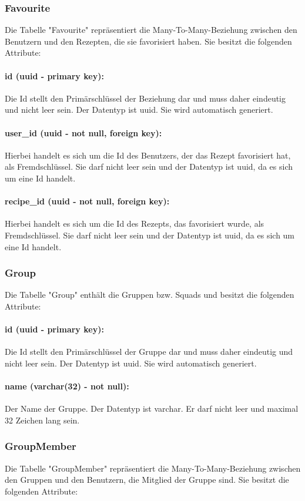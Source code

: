 \documentclass{entwurfsheft}
\begin{document}
\subsubsection{Favourite}
Die Tabelle "Favourite" repräsentiert die Many-To-Many-Beziehung zwischen den Benutzern und den Rezepten, die sie favorisiert haben. Sie besitzt die folgenden Attribute:
\paragraph{id (uuid - primary key):} Die Id stellt den Primärschlüssel der Beziehung dar und muss daher eindeutig und nicht leer sein. Der Datentyp ist \Gls{uuid}. Sie wird automatisch generiert.
\paragraph{user\_id (uuid - not null, foreign key):} Hierbei handelt es sich um die Id des Benutzers, der das Rezept favorisiert hat, als Fremdschlüssel. Sie darf nicht leer sein und der Datentyp ist \Gls{uuid}, da es sich um eine Id handelt.
\paragraph{recipe\_id (uuid - not null, foreign key):} Hierbei handelt es sich um die Id des Rezepts, das favorisiert wurde, als Fremdschlüssel. Sie darf nicht leer sein und der Datentyp ist \Gls{uuid}, da es sich um eine Id handelt.
\newpage
\subsubsection{Group}
Die Tabelle "Group" enthält die Gruppen bzw. Squads und besitzt die folgenden Attribute:
\paragraph{id (uuid - primary key):} Die Id stellt den Primärschlüssel der Gruppe dar und muss daher eindeutig und nicht leer sein. Der Datentyp ist \Gls{uuid}. Sie wird automatisch generiert.
\paragraph{name (varchar(32) - not null):} Der Name der Gruppe. Der Datentyp ist \Gls{varchar}. Er darf nicht leer und maximal 32 Zeichen lang sein.
\newpage
\subsubsection{GroupMember}
Die Tabelle "GroupMember" repräsentiert die Many-To-Many-Beziehung zwischen den Gruppen und den Benutzern, die Mitglied der Gruppe sind. Sie besitzt die folgenden Attribute:
\end{document}
